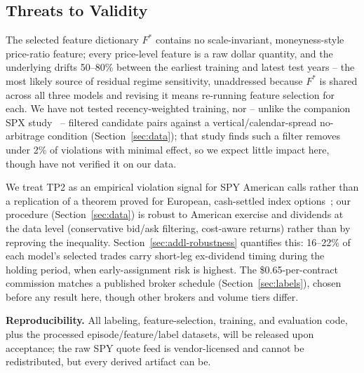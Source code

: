 \documentclass[sigconf,review,anonymous]{acmart}
\begin{document}
\subsection{Threats to Validity}
\label{sec:limitations}
The selected feature dictionary $F^{\ast}$ contains no scale-invariant, moneyness-style price-ratio feature; every price-level feature is a raw dollar quantity, and the underlying drifts 50--80\% between the earliest training and latest test years -- the most likely source of residual regime sensitivity, unaddressed because $F^{\ast}$ is shared across all three models and revising it means re-running feature selection for each. We have not tested recency-weighted training, nor -- unlike the companion SPX study~\cite{glasserman2025tp2} -- filtered candidate pairs against a vertical/calendar-spread no-arbitrage condition (Section~\ref{sec:data}); that study finds such a filter removes under 2\% of violations with minimal effect, so we expect little impact here, though have not verified it on our data.

We treat TP2 as an empirical violation signal for SPY American calls rather than a replication of a theorem proved for European, cash-settled index options~\cite{glasserman2026tp2theory,cosma2020earlyexercise}; our procedure (Section~\ref{sec:data}) is robust to American exercise and dividends at the data level (conservative bid/ask filtering, cost-aware returns) rather than by reproving the inequality. Section~\ref{sec:addl-robustness} quantifies this: 16--22\% of each model's selected trades carry short-leg ex-dividend timing during the holding period, when early-assignment risk is highest. The \$0.65-per-contract commission matches a published broker schedule (Section~\ref{sec:labels}), chosen before any result here, though other brokers and volume tiers differ.

\textbf{Reproducibility.} All labeling, feature-selection, training, and evaluation code, plus the processed episode/feature/label datasets, will be released upon acceptance; the raw SPY quote feed is vendor-licensed and cannot be redistributed, but every derived artifact can be.
\end{document}
